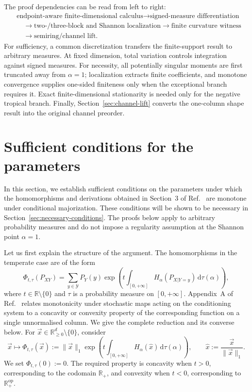 \documentclass[aps,pra,11pt,onecolumn,nofootinbib,tightenlines]{revtex4-2}
\theoremstyle{definition}
\begin{document}
The proof dependencies can be read from left to right:
\[
\begin{aligned}
&\text{endpoint-aware finite-dimensional calculus}
\longrightarrow \text{signed-measure differentiation}\\
&\quad\longrightarrow \text{two-/three-block and Shannon localization}
\longrightarrow \text{finite curvature witness}\\
&\quad\longrightarrow \text{semiring/channel lift}.
\end{aligned}
\]
For sufficiency, a common discretization transfers the finite-support result to
arbitrary measures.  At fixed dimension, total variation controls integration
against signed measures.  For necessity, all potentially singular moments are
first truncated away from $\alpha=1$; localization extracts finite coefficients,
and monotone convergence supplies one-sided finiteness only when the exceptional
branch requires it.  Exact finite-dimensional stationarity is needed only for
the negative tropical branch.  Finally, Section~\ref{sec:channel-lift} converts
the one-column shape result into the original channel preorder.

\setcounter{section}{3}
\section{Sufficient conditions for the parameters}
\label{sec:sufficient-conditions}

In this section, we establish sufficient conditions on the parameters under which the homomorphisms and derivations obtained in Section~3 of Ref.~\cite{rubboli2026complete} are monotone under conditional majorization. These conditions will be shown to be necessary in Section~\ref{sec:necessary-conditions}. The proofs below apply to arbitrary probability measures and do not impose a regularity assumption at the Shannon point $\alpha=1$.

Let us first explain the structure of the argument. The homomorphisms in the temperate case are of the form
\begin{equation}
 \Phi_{t,\tau}(P_{XY})
 =\sum_{y\in\mathcal Y}P_Y(y)
  \exp\!\left(
    t\int_{[0,+\infty]}H_\alpha(P_{X|Y=y})\,\mathrm d\tau(\alpha)
  \right),
 \label{eq:temperate-homomorphism-section4}
\end{equation}
where $t\in\mathbb R\setminus\{0\}$ and $\tau$ is a probability measure on $[0,+\infty]$. Appendix~A of Ref.~\cite{rubboli2026complete} relates monotonicity under stochastic maps acting on the conditioning system to a concavity or convexity property of the corresponding function on a single unnormalised column. We give the complete reduction and its converse below. For $\vec x\in\mathbb R^d_{\geq0}\setminus\{0\}$, consider
\begin{equation}
 \vec x\longmapsto
 \Phi_{t,\tau}(\vec x)
 :=\|\vec x\|_1
 \exp\!\left(
   t\int_{[0,+\infty]}H_\alpha(\widehat x)\,\mathrm d\tau(\alpha)
 \right),
 \qquad
 \widehat x:=\frac{\vec x}{\|\vec x\|_1}.
 \label{eq:single-column-Phi}
\end{equation}
We set $\Phi_{t,\tau}(0):=0$. The required property is concavity when $t>0$, corresponding to the codomain $\mathbb R_+$, and convexity when $t<0$, corresponding to $\mathbb R_+^{\mathrm{op}}$.
\end{document}
